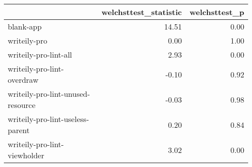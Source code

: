 \begin{tabular}{lrr}
\toprule
{} &  welchsttest\_statistic &  welchsttest\_p \\
\midrule
blank-app                         &                  14.51 &           0.00 \\
writeily-pro                      &                   0.00 &           1.00 \\
writeily-pro-lint-all             &                   2.93 &           0.00 \\
writeily-pro-lint-overdraw        &                  -0.10 &           0.92 \\
writeily-pro-lint-unused-resource &                  -0.03 &           0.98 \\
writeily-pro-lint-useless-parent  &                   0.20 &           0.84 \\
writeily-pro-lint-viewholder      &                   3.02 &           0.00 \\
\bottomrule
\end{tabular}
